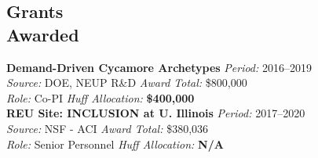\documentclass[margin,line]{resume}
\newcommand{\Cyclus}{\textsc{Cyclus}\xspace}%
\begin{document}
\begin{resume}
%
%
%
%
%
%
    \section{\mysidestyle Grants\\Awarded} 
    \textbf{Demand-Driven Cycamore Archetypes} \hfill \textsl{Period:} 2016--2019\\
    \textsl{Source:} DOE, NEUP R\&D \hfill \textsl{Award Total:} \$800,000\\
    \textsl{Role:} Co-PI \hfill \textsl{Huff Allocation:} 
    \textbf{\$400,000}\vspace{2mm}\\%
    \textbf{REU Site: INCLUSION at U. Illinois} \hfill \textsl{Period:} 2017--2020\\
    \textsl{Source:} NSF - ACI \hfill \textsl{Award Total:} \$380,036\\
    \textsl{Role:} Senior Personnel \hfill \textsl{Huff Allocation:} \textbf{N/A}

\end{resume}
\end{document}
